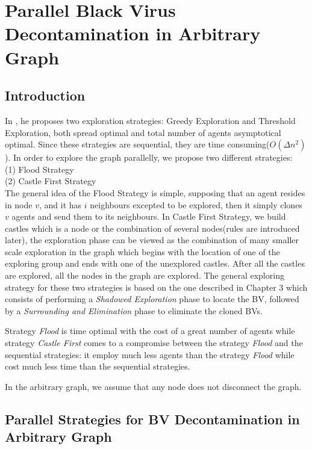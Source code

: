\chapter {Parallel Black Virus Decontamination in Arbitrary Graph}
\label{TL}

\section{Introduction}
In \cite{Cai}, he proposes two exploration strategies: Greedy Exploration and Threshold Exploration, both spread optimal and total number of agents asymptotical optimal. Since these strategies are sequential, they are time consuming($O(\Delta n^2)$).  In order to explore the graph parallelly, we propose two different strategies: \\
(1) Flood Strategy\\
(2) Castle First Strategy\\
The general idea of the Flood Strategy is simple, supposing that an agent resides in node $v$, and it has $i$ neighbours excepted to be explored, then it simply clones $v$ agents and send them to its neighbours. In Castle First Strategy, we build castles which is a node or the combination of several nodes(rules are introduced later), the exploration phase can be viewed as the combination of many smaller scale exploration in the graph which begins with the location of one of the exploring group and ends with one of the unexplored castles. After all the castles are explored, all the nodes in the graph are explored. The general exploring strategy for these two strategies is based on the one described in Chapter 3 which consists of performing a {\em Shadowed Exploration} phase to locate the BV, followed by a {\em Surrounding and Elimination} phase to eliminate the cloned BVs. 

Strategy {\em Flood}  is time optimal with the cost of a great number of agents while strategy {\em Castle First} comes to a compromise between the strategy {\em Flood} and the sequential strategies: it employ much less agents than the strategy {\em Flood} while cost much less time than the sequential strategies. 

In the arbitrary graph, we assume that any node does not disconnect the graph.

\section{Parallel Strategies for BV Decontamination in Arbitrary Graph}

